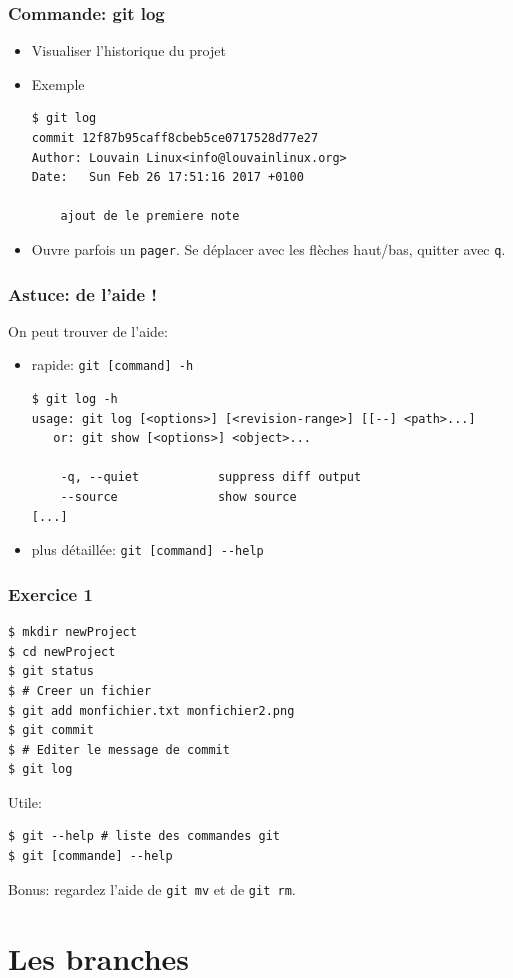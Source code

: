 \documentclass{beamer}
\begin{document}
\begin{frame}[fragile]
\frametitle{Commande: git log}

\begin{itemize}
    \item Visualiser l'historique du projet
    \item Exemple
\begin{lstlisting}
$ git log
commit 12f87b95caff8cbeb5ce0717528d77e27
Author: Louvain Linux<info@louvainlinux.org>
Date:   Sun Feb 26 17:51:16 2017 +0100

    ajout de le premiere note
\end{lstlisting}
    \item Ouvre parfois un \texttt{pager}. Se déplacer avec les flèches haut/bas, quitter avec \texttt{q}.
\end{itemize}
\end{frame}

\begin{frame}[fragile]
    \frametitle{Astuce: de l'aide !}
    On peut trouver de l'aide:
    \begin{itemize}
        \item rapide: \texttt{git [command] -h}
\begin{lstlisting}
$ git log -h
usage: git log [<options>] [<revision-range>] [[--] <path>...]
   or: git show [<options>] <object>...

    -q, --quiet           suppress diff output
    --source              show source
[...]
\end{lstlisting}
        \item plus détaillée: \lstinline{git [command] --help}
    \end{itemize}
\end{frame}

\begin{frame}[fragile]
\frametitle{Exercice 1}
\begin{lstlisting}
$ mkdir newProject
$ cd newProject
$ git status
$ # Creer un fichier
$ git add monfichier.txt monfichier2.png
$ git commit
$ # Editer le message de commit
$ git log
\end{lstlisting}
Utile:
\begin{lstlisting}
$ git --help # liste des commandes git
$ git [commande] --help
\end{lstlisting}
Bonus: regardez l'aide de \texttt{git mv} et de \texttt{git rm}.
\end{frame}

\section{Les branches}
\end{document}
